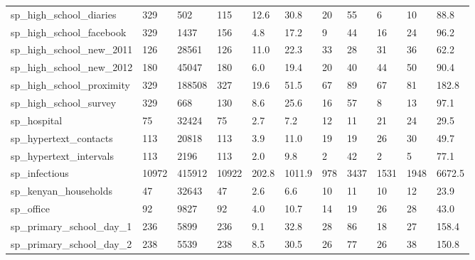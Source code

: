 \begin{longtable}{lllllllllll}
 sp\_high\_school\_diaries                             & 329        & 502       & 115   & 12.6   & 30.8   & 20    & 55     & 6      & 10     & 88.8    \\
 sp\_high\_school\_facebook                            & 329        & 1437      & 156   & 4.8    & 17.2   & 9     & 44     & 16     & 24     & 96.2    \\
 sp\_high\_school\_new\_2011                            & 126        & 28561     & 126   & 11.0   & 22.3   & 33    & 28     & 31     & 36     & 62.2    \\
 sp\_high\_school\_new\_2012                            & 180        & 45047     & 180   & 6.0    & 19.4   & 20    & 40     & 44     & 50     & 90.4    \\
 sp\_high\_school\_proximity                           & 329        & 188508    & 327   & 19.6   & 51.5   & 67    & 89     & 67     & 81     & 182.8   \\
 sp\_high\_school\_survey                              & 329        & 668       & 130   & 8.6    & 25.6   & 16    & 57     & 8      & 13     & 97.1    \\
 sp\_hospital                                        & 75         & 32424     & 75    & 2.7    & 7.2    & 12    & 11     & 21     & 24     & 29.5    \\
 sp\_hypertext\_contacts                              & 113        & 20818     & 113   & 3.9    & 11.0   & 19    & 19     & 26     & 30     & 49.7    \\
 sp\_hypertext\_intervals                             & 113        & 2196      & 113   & 2.0    & 9.8    & 2     & 42     & 2      & 5      & 77.1    \\
 sp\_infectious                                      & 10972      & 415912    & 10922 & 202.8  & 1011.9 & 978   & 3437   & 1531   & 1948   & 6672.5  \\
 sp\_kenyan\_households                               & 47         & 32643     & 47    & 2.6    & 6.6    & 10    & 11     & 10     & 12     & 23.9    \\
 sp\_office                                          & 92         & 9827      & 92    & 4.0    & 10.7   & 14    & 19     & 26     & 28     & 43.0    \\
 sp\_primary\_school\_day\_1                            & 236        & 5899      & 236   & 9.1    & 32.8   & 28    & 86     & 18     & 27     & 158.4   \\
 sp\_primary\_school\_day\_2                            & 238        & 5539      & 238   & 8.5    & 30.5   & 26    & 77     & 26     & 38     & 150.8   \\

\end{longtable}
